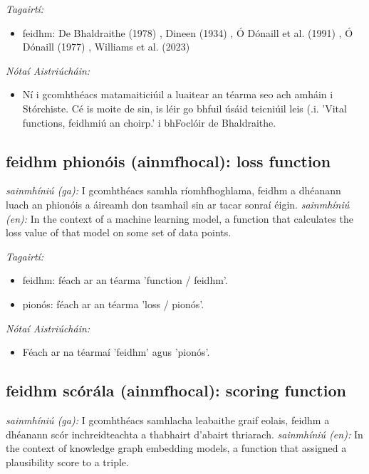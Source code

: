 \documentclass{article}
\begin{document}
 \noindent \textit{Tagairtí:}
\begin{itemize}
	\item feidhm: De Bhaldraithe (1978) \cite{de-bhaldraithe}, Dineen (1934) \cite{dineen}, Ó Dónaill et al. (1991) \cite{focloir-beag}, Ó Dónaill (1977) \cite{odonaill}, Williams et al. (2023) \cite{storchiste}
\end{itemize}

 \noindent \textit{Nótaí Aistriúcháin:}
\begin{itemize}
	\item Ní i gcomhthéacs matamaiticiúil a luaitear an téarma seo ach amháin i Stórchiste. Cé is moite de sin, is léir go bhfuil úsáid teicniúil leis (.i. 'Vital functions, feidhmiú an choirp.' i bhFoclóir de Bhaldraithe.
\end{itemize}


\subsection*{feidhm phionóis (ainmfhocal): loss function} 
 \noindent \textit{sainmhíniú (ga):} I gcomhthéacs samhla ríomhfhoghlama, feidhm a dhéanann luach an phionóis a áireamh don tsamhail sin ar tacar sonraí éigin.
\newline\newline
 \noindent \textit{sainmhíniú (en):} In the context of a machine learning model, a function that calculates the loss value of that model on some set of data points.
\newline

 \noindent \textit{Tagairtí:}
\begin{itemize}
	\item feidhm: féach ar an téarma 'function / feidhm'.
	\item pionós: féach ar an téarma 'loss / pionós'.
\end{itemize}

 \noindent \textit{Nótaí Aistriúcháin:}
\begin{itemize}
	\item Féach ar na téarmaí 'feidhm' agus 'pionós'.
\end{itemize}


\subsection*{feidhm scórála (ainmfhocal): scoring function} 
 \noindent \textit{sainmhíniú (ga):} I gcomhthéacs samhlacha leabaithe graif eolais, feidhm a dhéanann scór inchreidteachta a thabhairt d'abairt thriarach.
\newline\newline
 \noindent \textit{sainmhíniú (en):} In the context of knowledge graph embedding models, a function that assigned a plausibility score to a triple.
\newline
\end{document}
